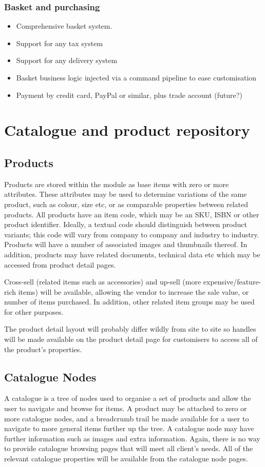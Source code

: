 \documentclass[12pt]{article}
\begin{document}
\subsubsection{Basket and purchasing}
\begin{itemize}
	\item Comprehensive basket system.
	\item Support for any tax system
	\item Support for any delivery system
	\item Basket business logic injected via a command pipeline to ease customisation
	\item Payment by credit card, PayPal or similar, plus trade account (future?)
\end{itemize}

\section{Catalogue and product repository}
\subsection{Products}
Products are stored within the module as base items with zero or more attributes. These attributes may be used to determine variations of the same product, such as colour, size etc, or as comparable properties between related products. All products have an item code, which may be an \textsc{SKU}, \textsc{ISBN} or other product identifier. Ideally, a textual code should distinguish between product variants; this code will vary from company to company and industry to industry. Products will have a number of associated images and thumbnails thereof. In addition, products may have related documents, technical data etc which may be accessed from product detail pages.

Cross-sell (related items such as accessories) and up-sell (more expensive/feature-rich items) will be available, allowing the vendor to increase the sale value, or number of items purchased. In addition, other related item groups may be used for other purposes.

The product detail layout will probably differ wildly from site to site so handles will be made available on the product detail page for customisers to access all of the product's properties.

\subsection{Catalogue Nodes}
A catalogue is a tree of nodes used to organise a set of products and allow the user to navigate and browse for items. A product may be attached to zero or more catalogue nodes, and a breadcrumb trail be made available for a user to navigate to more general items further up the tree. A catalogue node may have further information such as images and extra information. Again, there is no way to provide catalogue browsing pages that will meet all client's needs. All of the relevant catalogue properties will be available from the catalogue node pages.
\end{document}

